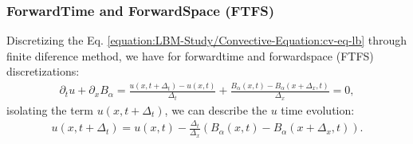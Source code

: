 \documentclass[letterpaper,10pt,english,openany,oneside]{jupyterBook}
\begin{document}
\subsubsection{Forward\sphinxhyphen{}Time and Forward\sphinxhyphen{}Space (FTFS)}
\label{\detokenize{LBM-Study/Convective-Equation:forward-time-and-forward-space-ftfs}}
\sphinxAtStartPar
Discretizing the Eq. \eqref{equation:LBM-Study/Convective-Equation:cv-eq-lb} through finite diference method, we have for forward\sphinxhyphen{}time and forward\sphinxhyphen{}space (FTFS) discretizations:
\begin{equation*}
\begin{split}
\partial_t u + \partial_{x}B_{\alpha}  = \frac{u(x,t + \Delta_{t}) - u(x,t) }{\Delta_{t}} + \frac{B_{\alpha}(x,t) - B_{\alpha}(x + \Delta_{x},t) }{\Delta_{x}} =0,
\end{split}
\end{equation*}
\sphinxAtStartPar
isolating the term \(u(x,t + \Delta_{t})\), we can describe the \(u\) time evolution:
\begin{equation*}
\begin{split}
u(x,t + \Delta_{t})   = u(x,t) - \frac{\Delta_{t}}{\Delta_{x}} \left( B_{\alpha}(x,t) - B_{\alpha}(x + \Delta_{x},t) \right) .
\end{split}
\end{equation*}
\end{document}
